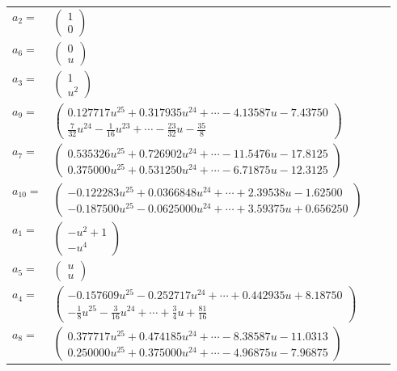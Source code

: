 \documentclass[1p]{elsarticle_modified}
\theoremstyle{definition}
\begin{document}
\begin{tabular}{m{7pt} m{180pt} m{7pt} m{180pt} }
\flushright $a_{2}=$&$\begin{pmatrix}1\\0\end{pmatrix}$ \\
\flushright $a_{6}=$&$\begin{pmatrix}0\\u\end{pmatrix}$ \\
\flushright $a_{3}=$&$\begin{pmatrix}1\\u^2\end{pmatrix}$ \\
\flushright $a_{9}=$&$\begin{pmatrix}0.127717 u^{25}+0.317935 u^{24}+\cdots-4.13587 u-7.43750\\\frac{7}{32} u^{24}-\frac{1}{16} u^{23}+\cdots-\frac{23}{32} u-\frac{35}{8}\end{pmatrix}$ \\
\flushright $a_{7}=$&$\begin{pmatrix}0.535326 u^{25}+0.726902 u^{24}+\cdots-11.5476 u-17.8125\\0.375000 u^{25}+0.531250 u^{24}+\cdots-6.71875 u-12.3125\end{pmatrix}$ \\
\flushright $a_{10}=$&$\begin{pmatrix}-0.122283 u^{25}+0.0366848 u^{24}+\cdots+2.39538 u-1.62500\\-0.187500 u^{25}-0.0625000 u^{24}+\cdots+3.59375 u+0.656250\end{pmatrix}$ \\
\flushright $a_{1}=$&$\begin{pmatrix}- u^2+1\\- u^4\end{pmatrix}$ \\
\flushright $a_{5}=$&$\begin{pmatrix}u\\u\end{pmatrix}$ \\
\flushright $a_{4}=$&$\begin{pmatrix}-0.157609 u^{25}-0.252717 u^{24}+\cdots+0.442935 u+8.18750\\-\frac{1}{8} u^{25}-\frac{3}{16} u^{24}+\cdots+\frac{3}{4} u+\frac{81}{16}\end{pmatrix}$ \\
\flushright $a_{8}=$&$\begin{pmatrix}0.377717 u^{25}+0.474185 u^{24}+\cdots-8.38587 u-11.0313\\0.250000 u^{25}+0.375000 u^{24}+\cdots-4.96875 u-7.96875\end{pmatrix}$ \\

\end{tabular}
\end{document}
